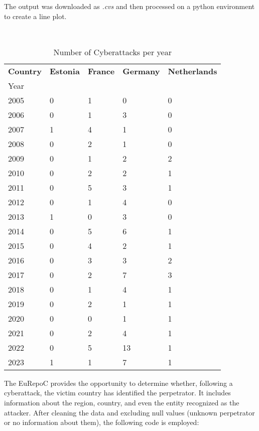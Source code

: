 The output was downloaded as \textit{.cvs} and then processed on a python environment to create a line plot. 


\newpage
{}

\

\begin{table}[h]
  \centering
  \begin{tabular}{lllll}
    \toprule
    \textbf{Country} & \textbf{Estonia} & \textbf{France} & \textbf{Germany} & \textbf{Netherlands} \\
    Year &  &  &  &  \\
    \midrule
    2005 & 0 & 1 & 0 & 0 \\
    2006 & 0 & 1 & 3 & 0 \\
    2007 & 1 & 4 & 1 & 0 \\
    2008  & 0 & 2 & 1 & 0 \\
    2009  & 0 & 1 & 2 & 2 \\
    2010 & 0 & 2 & 2 & 1 \\
    2011  & 0 & 5 & 3 & 1 \\
    2012  & 0 & 1 & 4 & 0 \\
    2013  & 1 & 0 & 3 & 0 \\
    2014  & 0 & 5 & 6 & 1 \\
    2015 & 0 & 4 & 2 & 1 \\
    2016  & 0 & 3 & 3 & 2 \\
    2017  & 0 & 2 & 7 & 3 \\
    2018 & 0 & 1 & 4 & 1 \\
    2019 & 0 & 2 & 1 & 1 \\
    2020 & 0 & 0 & 1 & 1 \\
    2021 & 0 & 2 & 4 & 1 \\
    2022 & 0 & 5 & 13 & 1 \\
    2023 & 1 & 1 & 7 & 1 \\
    \bottomrule
  \end{tabular}
  \caption{Number of Cyberattacks per year}
  \label{tab:cyberattacks_per_year}
\end{table}

\vspace{3cm}

The EuRepoC provides the opportunity to determine whether, following a cyberattack, the victim country has identified the perpetrator. It includes information about the region, country, and even the entity recognized as the attacker. After cleaning the data and excluding null values (unknown perpetrator or no information about them), the following code is employed:

